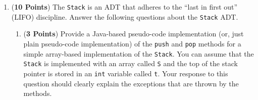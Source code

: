 \documentclass[12pt]{article}
\begin{document}
\begin{enumerate}
\begin{enumerate}
\end{enumerate}

\newpage

\item ({\bf 10 Points}) The {\tt Stack} is an ADT that adheres to the
  ``last in first out'' (LIFO) discipline.  Answer the following
  questions about the {\tt Stack} ADT.

  \begin{enumerate}




  \item ({\bf 3 Points}) Provide a Java-based pseudo-code
    implementation (or, just plain pseudo-code implementation) of the
    {\tt push} and {\tt pop} methods for a simple array-based
    implementation of the {\tt Stack}.  You can assume that the {\tt
      Stack} is implemented with an array called {\tt S} and the top
    of the stack pointer is stored in an {\tt int} variable called
    {\tt t}.  Your response to this question should clearly explain
    the exceptions that are thrown by the methods.


\end{enumerate}
\end{enumerate}
\end{document}
